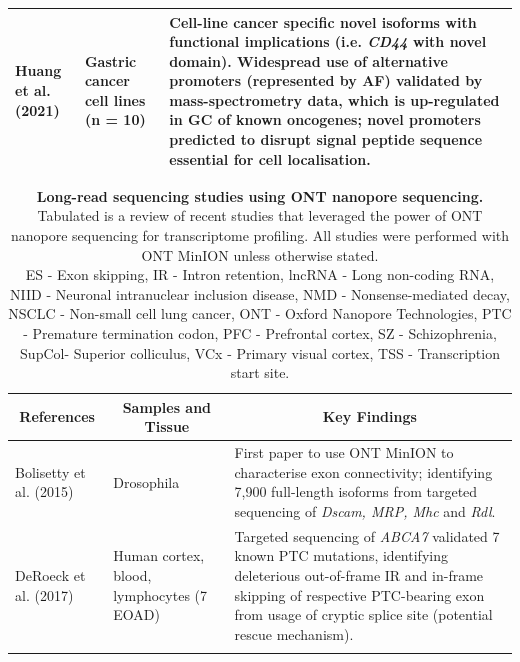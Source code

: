 \begin{landscape}
\begin{longtable}[c]{p{4cm}p{4cm}p{18cm}}
		\centering Huang et al. (2021) \cite{Huang2021} &
		\centering Gastric cancer cell lines (n = 10) &
		\tabitem Cell-line cancer specific novel isoforms with functional implications (i.e. \textit{CD44} with novel domain). \newline
		\tabitem Widespread use of alternative promoters (represented by AF) validated by mass-spectrometry data, which is up-regulated in GC of known oncogenes; novel promoters predicted to disrupt signal peptide sequence essential for cell localisation.   \\* \bottomrule
	\end{longtable}
	\clearpage
	\begin{longtable}[c]{p{4cm}p{4cm}p{18cm}}
		\caption[Long-read sequencing studies using ONT nanopore sequencing]%
		{\textbf{Long-read sequencing studies using ONT nanopore sequencing.} Tabulated is a review of recent studies that leveraged the power of ONT nanopore sequencing for transcriptome profiling. All studies were performed with ONT MinION unless otherwise stated. \newline ES - Exon skipping, IR - Intron retention, lncRNA - Long non-coding RNA, NIID - Neuronal intranuclear inclusion disease, NMD - Nonsense-mediated decay, NSCLC - Non-small cell lung cancer, ONT - Oxford Nanopore Technologies, PTC - Premature termination codon, PFC - Prefrontal cortex, SZ - Schizophrenia, SupCol- Superior colliculus, VCx - Primary visual cortex, TSS - Transcription start site.}
		\label{tab: longread_ontstudies}\\
		
		\toprule
		\multicolumn{1}{c}{References} &
		\multicolumn{1}{c}{Samples and Tissue} &
		\multicolumn{1}{c}{Key Findings} \\* \midrule
		\endfirsthead
		\endhead
		\bottomrule
		\endfoot
		\endlastfoot
		\centering Bolisetty et al. (2015)\cite{Bolisetty2015} &
		\centering Drosophila &
		\tabitem First paper to use ONT MinION to characterise exon connectivity; identifying 7,900 full-length isoforms from targeted sequencing of \textit{Dscam, MRP, Mhc} and \textit{Rdl}.  \\
		\hdashline[0.5pt/5pt]
		
		\centering DeRoeck et al. (2017)\cite{DeRoeck2017}  &
		\centering Human cortex, blood, lymphocytes (7 EOAD) &
		\tabitem Targeted sequencing of \textit{ABCA7} validated 7 known PTC mutations, identifying deleterious out-of-frame IR and in-frame skipping of respective PTC-bearing exon from usage of cryptic splice site (potential rescue mechanism). \\
		\hdashline[0.5pt/5pt]
		

\end{longtable}
\end{landscape}
